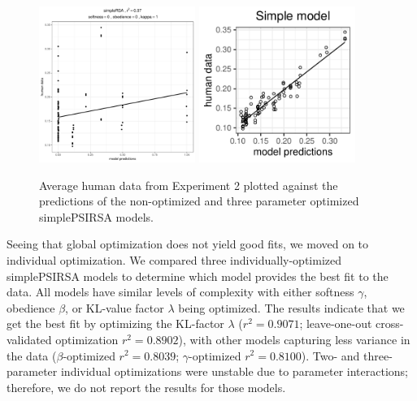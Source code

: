 \documentclass[10pt,a4paper]{article}
\begin{document}
\begin{figure}[ht]
	\centering
	\includegraphics[width=2in]{images/x3_m7.pdf}
	\includegraphics[width=2in]{images/x3_m11.pdf}
	\caption{Average human data from Experiment 2 plotted against the predictions of the non-optimized and three parameter optimized simplePSIRSA models. }
	\label{simple-full-x3}
\end{figure}



Seeing that global optimization does not yield good fits, we moved on to individual optimization. 
We compared three individually-optimized simplePSIRSA models to determine which model provides the best fit to the data. 
All models have similar levels of complexity with either softness $\gamma$, obedience $\beta$, or KL-value factor $\lambda$ being optimized.
The results indicate that we get the best fit by optimizing the KL-factor $\lambda$ ($r^{2}=0.9071$; leave-one-out cross-validated optimization $r^{2}=0.8902$), with other models capturing less variance in the data ($\beta$-optimized $r^{2}=0.8039$; $\gamma$-optimized $r^{2}=0.8100$).
Two- and three-parameter individual optimizations were unstable due to parameter interactions; therefore, we do not report the results for those models.
\end{document}
